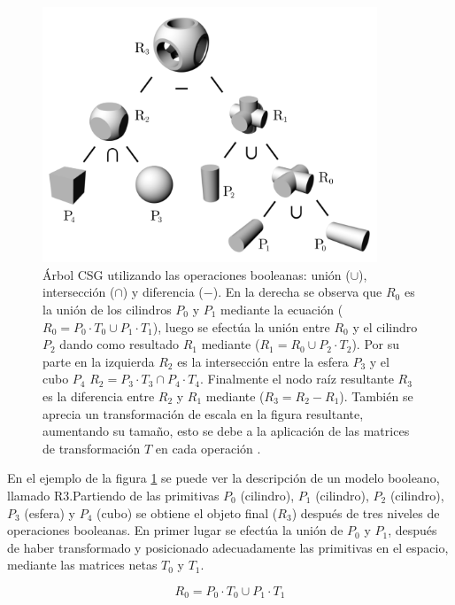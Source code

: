 \begin{figure}[ht]
\includegraphics[width=10cm]{Img/GEO/geo-booleano6.png}
\centering
\caption{\footnotesize{Árbol CSG utilizando las   operaciones booleanas: unión ($\cup$), intersección ($\cap$) y diferencia ($-$). En la derecha se observa que $R_0$ es la unión de los cilindros $P_0$ y $P_1$ mediante la ecuación ($R_0 = P_0\cdot T_0 \cup P_1\cdot T_1$), luego se efectúa la unión entre $R_0$ y el cilindro $P_2$ dando como resultado $R_1$ mediante ($R_1 = R_0 \cup P_2\cdot T_2$). Por su parte en la izquierda $R_2$ es la intersección entre la esfera $P_3$ y el cubo $P_4$ $R_2 = P_3\cdot T_3 \cap P_4\cdot T_4$. Finalmente el nodo raíz resultante $R_3$ es la diferencia entre $R_2$ y $R_1$ mediante ($R_3 = R_2 - R_1$). También se aprecia un transformación de escala en la figura resultante, aumentando su tamaño, esto se debe a la aplicación de las matrices de transformación $T$ en cada operación \citep{Wassermann_2016}.}}
\label{fig:bool}
\end{figure}

En el ejemplo de la figura \ref{fig:bool} se puede ver la descripción de un modelo booleano, llamado R3.\newline Partiendo de las primitivas $P_0$ (cilindro), $P_1$ (cilindro), $P_2$ (cilindro), $P_3$ (esfera) y $P_4$ (cubo) se obtiene el objeto final ($R_3$) después de tres niveles de operaciones booleanas.\newline
En primer lugar se efectúa la unión de $P_0$ y $P_1$, después de haber transformado y posicionado adecuadamente las primitivas en el espacio, mediante las matrices netas $T_0$ y $T_1$.

\begin{equation}
R_0 = P_0\cdot T_0 \cup P_1\cdot T_1
\end{equation}

